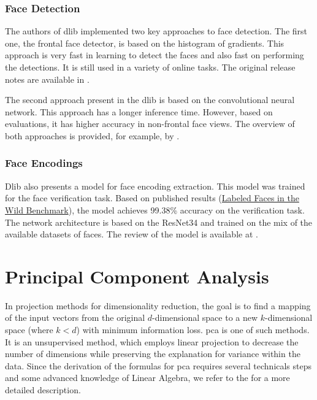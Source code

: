 \subsubsection*{Face Detection}

The authors of dlib implemented two key approaches to face detection. The first one, the frontal face detector, is based on the histogram of gradients. This approach is very fast in learning to detect the faces and also fast on performing the detections. It is still used in a variety of online tasks. The original release notes are available in \citep{king2017dlib_hog}.

The second approach present in the dlib is based on the convolutional neural network. This approach has a longer inference time. However, based on evaluations, it has higher accuracy in non-frontal face views. The overview of both approaches is provided, for example, by \citep{arun2018cnndlib}.

\subsubsection*{Face Encodings}

Dlib also presents a model for face encoding extraction. This model was trained for the face verification task. Based on published results (\href{http://vis-www.cs.umass.edu/lfw/results.html}{Labeled Faces in the Wild Benchmark}), the model achieves  99.38\% accuracy on the verification task. The network architecture is based on the ResNet34 and trained on the mix of the available datasets of faces. The review of the model is available at \citep{king2017high}.

\section{Principal Component Analysis}
\label{s:pca}

In projection methods for dimensionality reduction, the goal is to find a mapping of the input vectors from the original $d$-dimensional space to a new $k$-dimensional space (where $k < d$) with minimum information loss. \acrshort{pca} is one of such methods. It is an unsupervised method, which employs linear projection to decrease the number of dimensions while preserving the explanation for variance within the data. Since the derivation of the formulas for \acrshort{pca} requires several technicals steps and some advanced knowledge of Linear Algebra, we refer to the \cite{alpaydin2020introduction} for a more detailed description.

